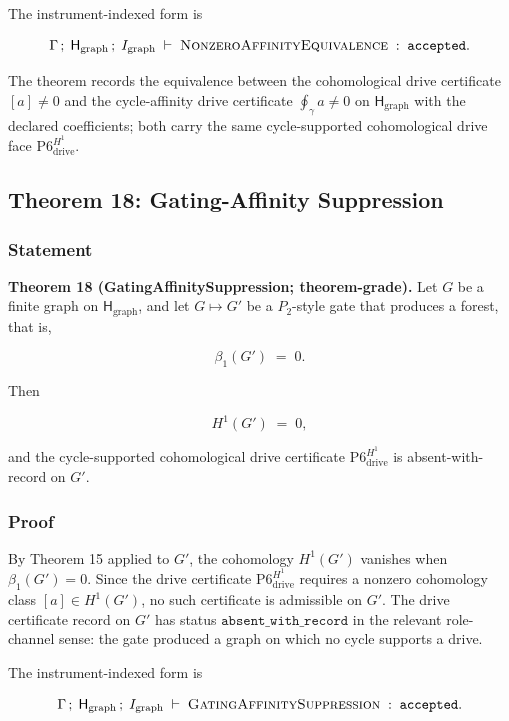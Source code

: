\documentclass[11pt]{article}
\theoremstyle{definition}
\begin{document}
The instrument-indexed form is

\[
\Gamma\,;\;\mathsf H_{\mathrm{graph}}\,;\;I_{\mathrm{graph}}\;\vdash\;\textsc{NonzeroAffinityEquivalence}\;:\;\texttt{accepted}.
\]

The theorem records the equivalence between the cohomological drive certificate \([a]\neq 0\) and the cycle-affinity drive certificate \(\oint_\gamma a\neq 0\) on \(\mathsf H_{\mathrm{graph}}\) with the declared coefficients; both carry the same cycle-supported cohomological drive face \(\mathrm{P6}_{\mathrm{drive}}^{H^1}\).

\subsection{Theorem 18: Gating-Affinity Suppression}

\subsubsection{Statement}

\textbf{Theorem 18 (GatingAffinitySuppression; theorem-grade).} Let \(G\) be a finite graph on \(\mathsf H_{\mathrm{graph}}\), and let \(G\mapsto G'\) be a \(P_2\)-style gate that produces a forest, that is,

\[
\beta_1(G')\;=\;0.
\]

Then

\[
H^1(G')\;=\;0,
\]

and the cycle-supported cohomological drive certificate \(\mathrm{P6}_{\mathrm{drive}}^{H^1}\) is absent-with-record on \(G'\).

\subsubsection{Proof}

By Theorem 15 applied to \(G'\), the cohomology \(H^1(G')\) vanishes when \(\beta_1(G')=0\). Since the drive certificate \(\mathrm{P6}_{\mathrm{drive}}^{H^1}\) requires a nonzero cohomology class \([a]\in H^1(G')\), no such certificate is admissible on \(G'\). The drive certificate record on \(G'\) has status \(\texttt{absent\_with\_record}\) in the relevant role-channel sense: the gate produced a graph on which no cycle supports a drive.

The instrument-indexed form is

\[
\Gamma\,;\;\mathsf H_{\mathrm{graph}}\,;\;I_{\mathrm{graph}}\;\vdash\;\textsc{GatingAffinitySuppression}\;:\;\texttt{accepted}.
\]
\end{document}
